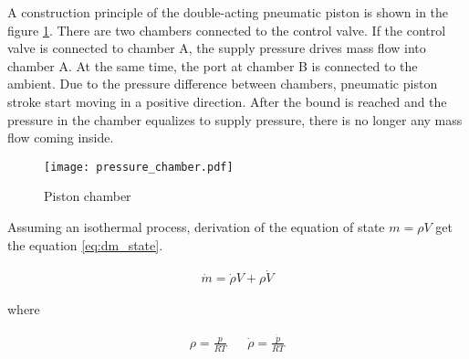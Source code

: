 A construction principle of the double-acting pneumatic piston is shown in
the figure \ref{fig:pist_chamb}.  There are two chambers connected to the control valve.
If the control valve is connected to chamber A, the supply pressure drives
mass flow into chamber A. At the same time, the port at chamber B is
connected to the ambient. Due to the pressure difference between chambers,
pneumatic piston stroke start moving in a positive direction. 
After the bound is reached and the pressure in the chamber equalizes to
supply pressure, there is no longer any mass flow coming inside.


\begin{figure}[h!]
    \centering
    \texttt{[image: pressure\_chamber.pdf]}
    \caption{Piston chamber}
    \label{fig:pist_chamb}
\end{figure}

Assuming an isothermal process, derivation of the equation of state $m =
\rho V$ get the equation \ref{eq:dm_state}. 

\begin{align}
    \dot{m} = \dot{\rho} V + \rho \dot{V}
    \label{eq:dm_state}
\end{align}

where

\begin{align}
    \rho = \frac{p}{RT} &&
    \dot{\rho} = \frac{\dot{p}}{RT} 
\end{align}


